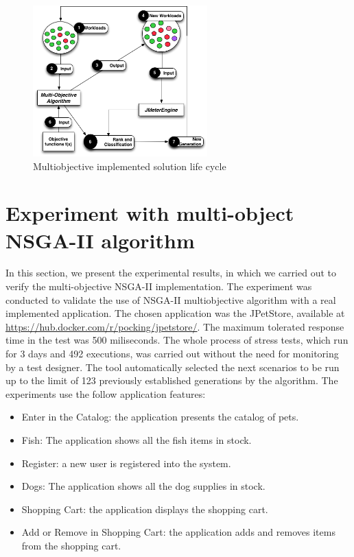 \documentclass{report}
\begin{document}
\begin{figure}[!h]

\centering
\includegraphics[width=0.6\textwidth]{./images/step3.png}
\caption{Multiobjective implemented solution life cycle}
\label{fig:step2}
\end{figure}


\section{Experiment with multi-object NSGA-II algorithm}

In this section,  we present the experimental results,  in which we carried out to verify the multi-objective NSGA-II   implementation. The experiment was conducted to validate the use of NSGA-II multiobjective algorithm with a real implemented application. The chosen application was the JPetStore, available at \url{https://hub.docker.com/r/pocking/jpetstore/}. The maximum tolerated response time in the test was 500 miliseconds.  The whole process of stress  tests, which run for 3 days and 492 executions, was carried out without the need for monitoring by a test designer. The tool automatically selected the next scenarios to be run up to the limit of 123 previously established  generations by the algorithm. The experiments use the follow application features:


\begin{itemize}
\item Enter in the Catalog: the application presents the catalog of pets.
\item Fish: The application shows all the fish items in stock.
\item Register:  a new user is registered into the system.
\item Dogs: The application shows all the dog supplies in stock.
\item Shopping Cart: the application displays the shopping cart.
\item Add or Remove in Shopping Cart: the application adds and removes items from the shopping cart.
\end{itemize}
\end{document}
